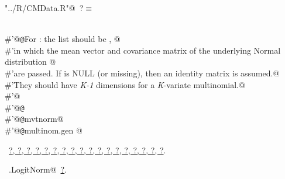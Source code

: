 \documentclass[reqno]{amsart}
\renewcommand{\NWtarget}[2]{\hypertarget{#1}{#2}}
\renewcommand{\NWlink}[2]{\hyperlink{#1}{#2}}
\begin{document}
\begin{flushleft} \small\label{scrap15}\raggedright\small
\NWtarget{nuweb?}{} \verb@"../R/CMData.R"@\nobreak\ {\footnotesize {?}}$\equiv$
\vspace{-1ex}
\begin{list}{}{} \item
\mbox{}\verb@@\\
\mbox{}\verb@#'@{\tt @}\verb@details For : the  list should be , @\\
\mbox{}\verb@#'in which the mean vector and covariance matrix of the underlying Normal distribution @\\
\mbox{}\verb@#'are passed. If  is NULL (or missing), then an identity matrix is assumed.@\\
\mbox{}\verb@#'They should have \emph{K-1} dimensions for a \emph{K}-variate multinomial.@\\
\mbox{}\verb@#'@\\
\mbox{}\verb@#'@{\tt @}\verb@export@\\
\mbox{}\verb@#'@{\tt @}\verb@import mvtnorm@\\
\mbox{}\verb@#'@{\tt @}\verb@rdname multinom.gen @\\
\mbox{}\verb@@{\NWsep}
\end{list}
\vspace{-1.5ex}
\footnotesize
\begin{list}{}{\setlength{\itemsep}{-\parsep}\setlength{\itemindent}{-\leftmargin}}
\item \NWtxtFileDefBy\ \NWlink{nuweb?}{?}\NWlink{nuweb?}{, ?}\NWlink{nuweb?}{, ?}\NWlink{nuweb?}{, ?}\NWlink{nuweb?}{, ?}\NWlink{nuweb?}{, ?}\NWlink{nuweb?}{, ?}\NWlink{nuweb?}{, ?}\NWlink{nuweb?}{, ?}\NWlink{nuweb?}{, ?}\NWlink{nuweb?}{, ?}\NWlink{nuweb?}{, ?}\NWlink{nuweb?}{, ?}\NWlink{nuweb?}{, ?}\NWlink{nuweb?}{, ?}\NWlink{nuweb?}{, ?}\NWlink{nuweb?}{, ?}\NWlink{nuweb?}{, ?}.
\item \NWtxtIdentsUsed\nobreak\  \verb@mg.LogitNorm@\nobreak\ \NWlink{nuweb?}{?}.
\item{}
\end{list}
\vspace{4ex}
\end{flushleft}
\end{document}
